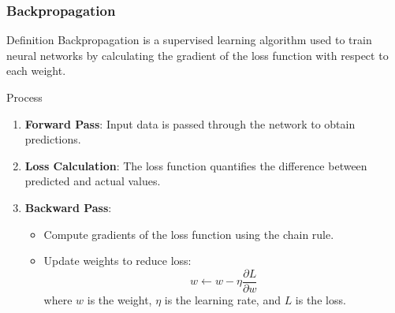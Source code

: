 \documentclass[aspectratio=169]{beamer}
\begin{document}
\begin{frame}[fragile]
    \frametitle{Backpropagation}
    \begin{block}{Definition}
        Backpropagation is a supervised learning algorithm used to train neural networks by calculating the gradient of the loss function with respect to each weight.
    \end{block}
    
    \begin{block}{Process}
        \begin{enumerate}
            \item \textbf{Forward Pass}: Input data is passed through the network to obtain predictions.
            \item \textbf{Loss Calculation}: The loss function quantifies the difference between predicted and actual values.
            \item \textbf{Backward Pass}:
            \begin{itemize}
                \item Compute gradients of the loss function using the chain rule.
                \item Update weights to reduce loss: 
                \begin{equation}
                    w \leftarrow w - \eta \frac{\partial L}{\partial w}
                \end{equation}
                where \(w\) is the weight, \(\eta\) is the learning rate, and \(L\) is the loss.
            \end{itemize}
        \end{enumerate}
    \end{block}
\end{frame}
\end{document}
